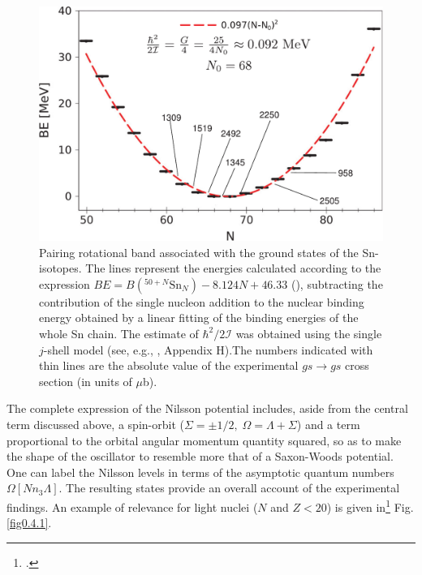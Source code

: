 \begin{figure}
	\centerline {
		\includegraphics*[width=12cm, angle=0.]{introduccion/figs/fig0_4_5_v3}
	}
	\caption{Pairing rotational band associated with the ground states of the Sn-isotopes. The lines represent the energies calculated according to the expression $BE = B( ^{50+N}\text{Sn}_N ) - 8.124N + 46.33$ (\cite{Brink:05}), subtracting the contribution of the single nucleon addition to the nuclear binding		energy obtained by a linear fitting of the binding energies of the whole Sn chain. The estimate of $\hbar^2/2\mathcal I$ was obtained using the single $j$-shell model (see, e.g., \cite{Brink:05}, Appendix H).The numbers indicated with thin lines  are the absolute value of the experimental $gs\to gs$ cross section (in units of $\mu $b).}
	\label{fig0.4.5}
\end{figure}
The complete expression of the Nilsson potential includes, aside from the central term discussed above, a spin-orbit ($\Sigma=\pm1/2,\;\Omega=\Lambda+\Sigma$) and a term proportional to the orbital angular momentum quantity squared, so as to make the shape of the oscillator to resemble more that of a Saxon-Woods potential. One can  label the Nilsson levels in terms of the asymptotic quantum numbers $\Omega[Nn_3\Lambda]$. The resulting states provide an overall account of the experimental findings. An example of relevance for light nuclei ($N$ and $Z<20$) is given in\footnote{\cite{Mottelson:59}.} Fig. \ref{fig0.4.1}.

